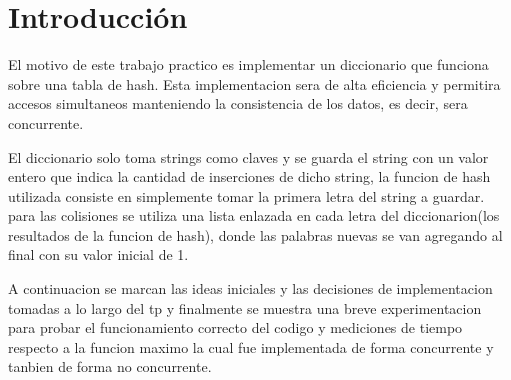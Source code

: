 \section{Introducción}


El motivo de este trabajo practico es implementar un diccionario que funciona
sobre una tabla de hash.
Esta implementacion sera de alta eficiencia y permitira accesos simultaneos
manteniendo la consistencia de los datos, es decir, sera concurrente.


El diccionario solo toma strings como claves y se guarda el string con un valor entero
que indica la cantidad de inserciones de dicho string, la funcion
de hash utilizada consiste en simplemente tomar la primera letra del string
a guardar. para las colisiones se utiliza una lista enlazada en cada letra
del diccionarion(los resultados de la funcion de hash),
donde las palabras nuevas se van agregando al final con
su valor inicial de 1.


A continuacion se marcan las ideas iniciales y las decisiones de implementacion
tomadas a lo largo del tp y finalmente se muestra una breve experimentacion
para probar el funcionamiento correcto del codigo y mediciones de tiempo respecto
a la funcion maximo la cual fue implementada de forma concurrente y tanbien
de forma no concurrente.
